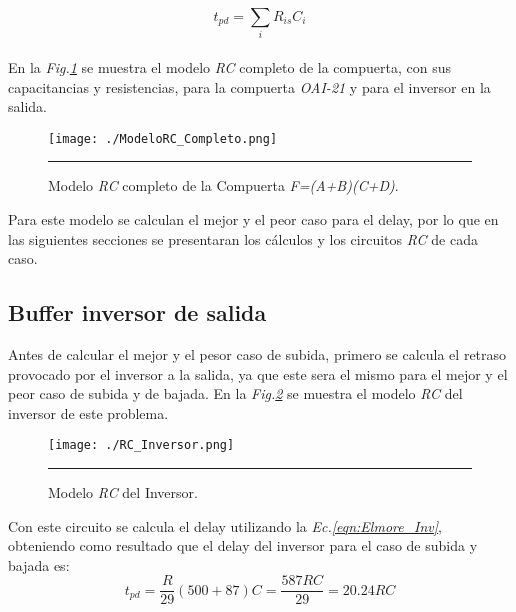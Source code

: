 \documentclass[12pt,a4paper]{article} %
\begin{document}
\begin{equation}\label{eqn:Elmore}
t_{pd} = \sum_{i} R_{is}C_{i}
\end{equation}\\



En la \textit{Fig.\ref{fig:ModeloRC_Completo}} se muestra el modelo \textit{RC} completo de la compuerta, con sus capacitancias y resistencias, para la compuerta \textit{OAI-21} y para el inversor en la salida.\\

\begin{figure}[htbp]
  \centering
    \texttt{[image: ./ModeloRC\_Completo.png]}
    \rule{35em}{0.5pt}
  \caption[IdealvsSim]{Modelo \textit{RC} completo de la Compuerta \textit{F=(A+B)(C+D)}.}
  \label{fig:ModeloRC_Completo}
\end{figure}

Para este modelo se calculan el mejor y el peor caso para el delay, por lo que en las siguientes secciones se presentaran los cálculos y los circuitos \textit{RC} de cada caso.\\

\subsection{Buffer inversor de salida}

Antes de calcular el mejor y el pesor caso de subida, primero se calcula el retraso provocado por el inversor a la salida, ya que este sera el mismo para el mejor y el peor caso de subida y de bajada. En la \textit{Fig.\ref{fig:RC_Inversor}} se muestra el modelo \textit{RC} del inversor de este problema.\\

\begin{figure}[htbp]
  \centering
    \texttt{[image: ./RC\_Inversor.png]}
    \rule{35em}{0.5pt}
  \caption[IdealvsSim]{Modelo \textit{RC} del Inversor.}
  \label{fig:RC_Inversor}
\end{figure}

Con este circuito se calcula el delay utilizando la \textit{Ec.\ref{eqn:Elmore_Inv}}, obteniendo como resultado que el delay del inversor para el caso de subida y bajada es:\\

\begin{equation}\label{eqn:Elmore_Inv}
t_{pd} = \frac{R}{29}(500 + 87)C = \frac{587RC}{29} = 20.24RC
\end{equation}\\
\end{document}
